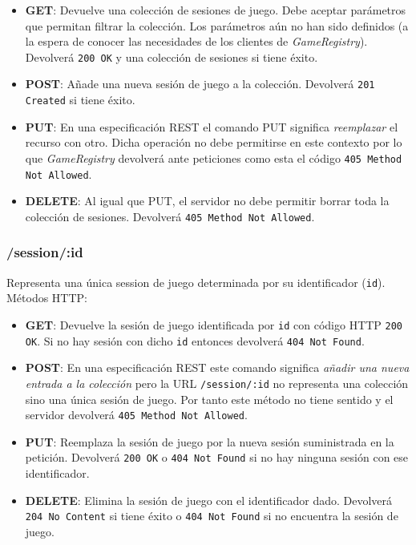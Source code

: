 \begin{itemize}
 \item \textbf{GET}: Devuelve una colección de sesiones de juego. Debe aceptar
       parámetros que permitan filtrar la colección. Los parámetros aún no han
       sido definidos (a la espera de conocer las necesidades de los clientes 
       de \emph{GameRegistry}). Devolverá \texttt{200 OK} y una colección de
       sesiones si tiene éxito.
 \item \textbf{POST}: Añade una nueva sesión de juego a la colección. Devolverá
       \texttt{201 Created} si tiene éxito.
 \item \textbf{PUT}: En una especificación REST el comando PUT significa 
       \emph{reemplazar} el recurso con otro. Dicha operación no debe permitirse
       en este contexto por lo que \emph{GameRegistry} devolverá ante peticiones
       como esta el código \texttt{405 Method Not Allowed}.
 \item \textbf{DELETE}: Al igual que PUT, el servidor no debe permitir borrar toda
       la colección de sesiones. Devolverá \texttt{405 Method Not Allowed}.
\end{itemize}

\subsubsection{/session/:id}
Representa una única session de juego determinada por su identificador (\texttt{id}). 
Métodos HTTP:

\begin{itemize}
 \item \textbf{GET}: Devuelve la sesión de juego identificada por \texttt{id} con
       código HTTP \texttt{200 OK}. Si no hay sesión con dicho \texttt{id} entonces
       devolverá \texttt{404 Not Found}.
 \item \textbf{POST}: En una especificación REST este comando significa 
       \emph{añadir una nueva entrada a la colección} pero la URL 
       \texttt{/session/:id} no representa una colección sino una única sesión de juego.
       Por tanto este método no tiene sentido y el servidor devolverá 
       \texttt{405 Method Not Allowed}.
 \item \textbf{PUT}: Reemplaza la sesión de juego por la nueva sesión suministrada
       en la petición. Devolverá \texttt{200 OK} o \texttt{404 Not Found} si no hay
       ninguna sesión con ese identificador.
 \item \textbf{DELETE}: Elimina la sesión de juego con el identificador dado. Devolverá
       \texttt{204 No Content} si tiene éxito o \texttt{404 Not Found} si no encuentra
       la sesión de juego.
\end{itemize}

